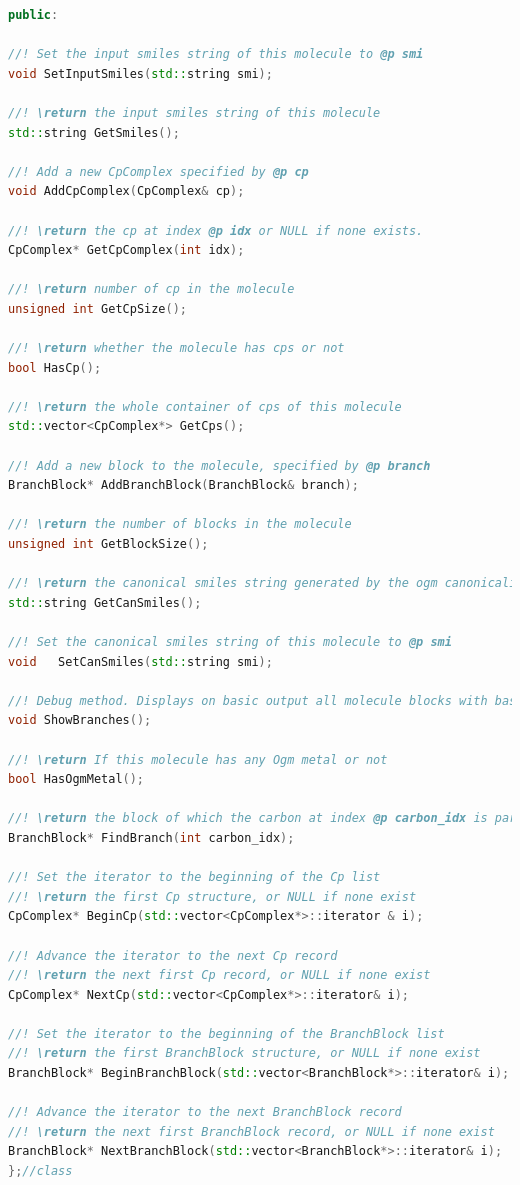 \begin{itemize}
\begin{lstlisting}[language=C++]
    public: 
    
//! Set the input smiles string of this molecule to @p smi
void SetInputSmiles(std::string smi);

//! \return the input smiles string of this molecule
std::string GetSmiles();

//! Add a new CpComplex specified by @p cp
void AddCpComplex(CpComplex& cp);

//! \return the cp at index @p idx or NULL if none exists.
CpComplex* GetCpComplex(int idx);

//! \return number of cp in the molecule
unsigned int GetCpSize();

//! \return whether the molecule has cps or not
bool HasCp();

//! \return the whole container of cps of this molecule
std::vector<CpComplex*> GetCps();

//! Add a new block to the molecule, specified by @p branch
BranchBlock* AddBranchBlock(BranchBlock& branch);

//! \return the number of blocks in the molecule
unsigned int GetBlockSize();

//! \return the canonical smiles string generated by the ogm canonicalization methods
std::string GetCanSmiles();

//! Set the canonical smiles string of this molecule to @p smi
void   SetCanSmiles(std::string smi);

//! Debug method. Displays on basic output all molecule blocks with basic information of the atoms.
void ShowBranches();

//! \return If this molecule has any Ogm metal or not
bool HasOgmMetal();

//! \return the block of which the carbon at index @p carbon_idx is part, or NULL if no such block exists
BranchBlock* FindBranch(int carbon_idx);

//! Set the iterator to the beginning of the Cp list
//! \return the first Cp structure, or NULL if none exist
CpComplex* BeginCp(std::vector<CpComplex*>::iterator & i);

//! Advance the iterator to the next Cp record
//! \return the next first Cp record, or NULL if none exist
CpComplex* NextCp(std::vector<CpComplex*>::iterator& i);

//! Set the iterator to the beginning of the BranchBlock list
//! \return the first BranchBlock structure, or NULL if none exist
BranchBlock* BeginBranchBlock(std::vector<BranchBlock*>::iterator& i);

//! Advance the iterator to the next BranchBlock record
//! \return the next first BranchBlock record, or NULL if none exist
BranchBlock* NextBranchBlock(std::vector<BranchBlock*>::iterator& i);
};//class
    \end{lstlisting}



\end{itemize}
